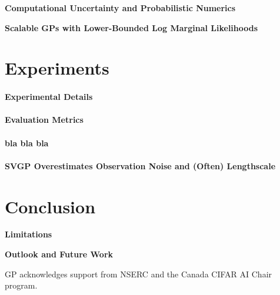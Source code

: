\documentclass{article}
\begin{document}
\textbf{Computational Uncertainty and Probabilistic Numerics}\quad


\textbf{Scalable GPs with Lower-Bounded Log Marginal Likelihoods}\quad


\section{Experiments}
\label{sec:experiments}





\paragraph{Experimental Details}

\paragraph{Evaluation Metrics}



\paragraph{bla bla bla}


\paragraph{SVGP Overestimates Observation Noise and (Often) Lengthscale}

\section{Conclusion}



\textbf{Limitations}\quad


\textbf{Outlook and Future Work}\quad


\newpage

\begin{ack}
    GP acknowledges support from NSERC and the Canada CIFAR AI Chair program.
\end{ack}

{
	\small
	\nocite{*}
	\printbibliography
}

\clearpage

\end{document}
